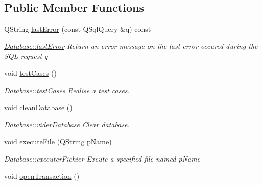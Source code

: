 \subsection*{Public Member Functions}
\begin{DoxyCompactItemize}
\item 
Q\-String \hyperlink{classDatabases_1_1Database_a00fcd95238619a41f7a734deaef3ea9f}{last\-Error} (const Q\-Sql\-Query \&q) const 
\begin{DoxyCompactList}\small\item\em \hyperlink{classDatabases_1_1Database_a00fcd95238619a41f7a734deaef3ea9f}{Database\-::last\-Error} Return an error message on the last error occured during the S\-Q\-L request {\itshape q} \end{DoxyCompactList}\item 
\hypertarget{classDatabases_1_1Database_a5029595698d889af5089428071c6ecda}{void \hyperlink{classDatabases_1_1Database_a5029595698d889af5089428071c6ecda}{test\-Cases} ()}\label{classDatabases_1_1Database_a5029595698d889af5089428071c6ecda}

\begin{DoxyCompactList}\small\item\em \hyperlink{classDatabases_1_1Database_a5029595698d889af5089428071c6ecda}{Database\-::test\-Cases} Realise a test cases. \end{DoxyCompactList}\item 
\hypertarget{classDatabases_1_1Database_a52c30975504e35c7c475a52817d66b73}{void \hyperlink{classDatabases_1_1Database_a52c30975504e35c7c475a52817d66b73}{clean\-Database} ()}\label{classDatabases_1_1Database_a52c30975504e35c7c475a52817d66b73}

\begin{DoxyCompactList}\small\item\em Database\-::vider\-Database Clear database. \end{DoxyCompactList}\item 
void \hyperlink{classDatabases_1_1Database_a21f6c86f95b149ac7dbf0ffc94021a93}{execute\-File} (Q\-String p\-Name)
\begin{DoxyCompactList}\small\item\em Database\-::executer\-Fichier Exeute a specified file named {\itshape p\-Name} \end{DoxyCompactList}\item 
\hypertarget{classDatabases_1_1Database_a64d55cd9452bbf2a6fd1693df004de59}{void \hyperlink{classDatabases_1_1Database_a64d55cd9452bbf2a6fd1693df004de59}{open\-Transaction} ()}\label{classDatabases_1_1Database_a64d55cd9452bbf2a6fd1693df004de59}


\end{DoxyCompactItemize}
